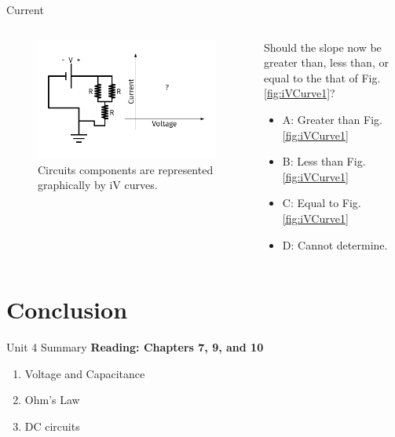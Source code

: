 \documentclass{beamer}
\begin{document}
\begin{frame}{Current}
\begin{columns}[T]
\begin{column}{0.5\textwidth}
\begin{figure}
\centering
\includegraphics[width=\textwidth,trim=0.5cm 0cm 1cm 0cm,clip=true]{figures/iVCurve4.pdf}
\caption{\label{fig:iVCurve4} Circuits components are represented graphically by iV curves.}
\end{figure}
\end{column}
\begin{column}{0.5\textwidth}
\small
Should the slope now be greater than, less than, or equal to the that of Fig. \ref{fig:iVCurve1}?
\begin{itemize}
\item A: Greater than Fig. \ref{fig:iVCurve1}
\item B: Less than Fig. \ref{fig:iVCurve1}
\item C: Equal to Fig. \ref{fig:iVCurve1}
\item D: Cannot determine.
\end{itemize}
\end{column}
\end{columns}
\end{frame}

\section{Conclusion}

\begin{frame}{Unit 4 Summary}
\textbf{Reading: Chapters 7, 9, and 10}
\begin{enumerate}
\item \alert{Voltage and Capacitance}
\item Ohm's Law
\item DC circuits
\end{enumerate}
\end{frame}
\end{document}
